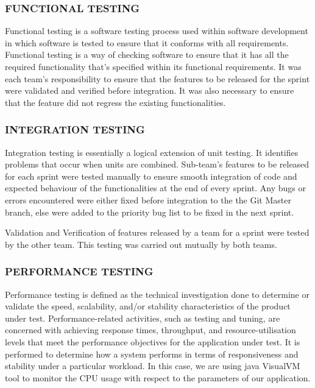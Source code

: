 \documentclass[11pt,a4paper]{article}
\begin{document}
	\subsubsection{FUNCTIONAL TESTING}
	
	Functional testing is a software testing process used within software development in which software is tested to ensure that it conforms with all requirements. Functional testing is a way of checking software to ensure that it has all the required functionality that's specified within its functional requirements. \cite{func} It was each team’s responsibility to ensure that the features to be released for the sprint were validated and verified before integration. It was also necessary to ensure that the feature did not regress the existing functionalities.
	
	\subsubsection{INTEGRATION TESTING}
	Integration testing is essentially a logical extension of unit
	testing. It identifies problems that occur when units are combined.\cite{int03} Sub-team’s features to be released for each sprint were tested manually to ensure smooth integration of code and expected behaviour of the functionalities at the end of every sprint.
	Any bugs or errors encountered were either fixed before integration to the the Git Master branch, else were added to the priority bug list to be fixed in the next sprint.

	Validation and Verification of features released by a team for a sprint were tested by the other team. This testing was carried out mutually by both teams.
	
	\subsubsection{PERFORMANCE TESTING}
	Performance testing is defined as the technical investigation done to determine or validate the speed, scalability, and/or stability characteristics of the product under test. Performance-related activities, such as testing and tuning, are concerned with achieving response times, throughput, and resource-utilisation levels that meet the performance objectives for the application under test. It is performed to determine how a system performs in terms of responsiveness and stability under a particular workload. In this case, we are using java VisualVM tool to monitor the CPU usage with respect to the parameters of our application.
		
\end{document}

